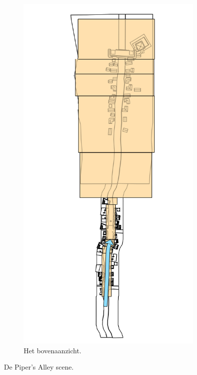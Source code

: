\begin{figure}[t]
\begin{subfigure}[b]{0.3\textwidth}
    \centering\includegraphics[width=\textwidth]{./img/raw/test-suite-pipers-alley-map.png}
    \caption{Het bovenaanzicht.}
    \label{fig:test-suite-pipers-alley-map}
  \end{subfigure}
  \caption{De Piper's Alley scene.}
  \label{fig:test-suite-alley}
\end{figure}

